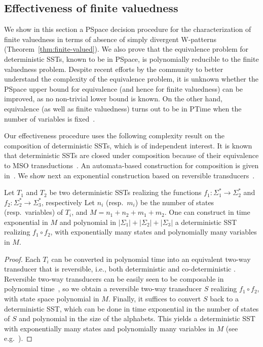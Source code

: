 \documentclass{article}
\providecommand{\AP}{}\NewDocumentCommand{\reintro}{o m}{#2}
\begin{document}
\subsection{Effectiveness of finite valuedness}\label{subsec:effectiveness}

We show in this section a {\upshape\sc PSpace} decision procedure for the characterization of finite valuedness 
in terms of absence of simply divergent W-patterns 
(Theorem~\ref{thm:finite-valued}). 
We also prove that the equivalence problem for deterministic SSTs, 
known to be in {\upshape\sc PSpace}, is polynomially reducible to the 
finite valuedness problem. Despite recent efforts by the community 
to better understand the complexity of the equivalence problem, 
it is unknown whether the {\upshape\sc PSpace} upper bound for equivalence 
(and hence for finite valuedness) can be improved, as no non-trivial 
lower bound is known. 
On the other hand, equivalence (as well as finite valuedness) 
turns out to be in {\upshape\sc PTime} when the number of variables is 
fixed~\cite{DBLP:conf/icalp/AlurD11}. 



Our effectiveness procedure uses the following complexity result on the
composition of deterministic SSTs, which is of independent interest.
It is known
that deterministic SSTs are closed under
composition because of their equivalence to 
MSO transductions~\cite{DBLP:conf/fsttcs/AlurC10}. An automata-based construction for composition is given
in~\cite{DBLP:journals/corr/abs-2209-05448}. We show next an exponential construction 
based on reversible transducers~\cite{DBLP:conf/icalp/DartoisFJL17}. 


\begin{proposition}\label{prop:compo}
Let $T_1$ and $T_2$ be two deterministic SSTs realizing the functions
$f_1 : \Sigma_1^*\rightarrow \Sigma_2^*$ and $f_2 :
\Sigma_2^*\rightarrow \Sigma_3^*$, respectively
Let $n_i$ (resp.~$m_i$) be the number of states  (resp.~variables) 
of $T_i$, and $M = n_1+n_2+m_1+m_2$. %
One can construct in time exponential in $M$ and 
polynomial in $|\Sigma_1|+|\Sigma_2|+|\Sigma_3|$ 
a deterministic SST realizing $f_1\circ f_2$, 
with exponentially many states and polynomially many
variables in $M$.
\end{proposition}

\begin{proof}
\AP
Each $T_i$ can be converted in
polynomial time into an equivalent 
two-way transducer that is reversible,
i.e., both deterministic and co-deterministic
\cite{DBLP:conf/icalp/DartoisFJL17}. 
Reversible two-way transducers can be easily seen to be composable
in polynomial time~\cite{DBLP:conf/icalp/DartoisFJL17}, so we obtain a reversible two-way transducer $S$ 
realizing $f_1\circ f_2$, with state space polynomial
in $M$. Finally, it suffices to convert $S$ back to a deterministic SST, 
which can be done in time exponential in the number of states of $S$ and polynomial 
in the size of the alphabets. This yields a deterministic SST with 
exponentially many states and polynomially many variables in $M$ 
(see e.g.~\cite{ledent13,DBLP:journals/ijfcs/DartoisJR18}).
\end{proof}
\end{document}
